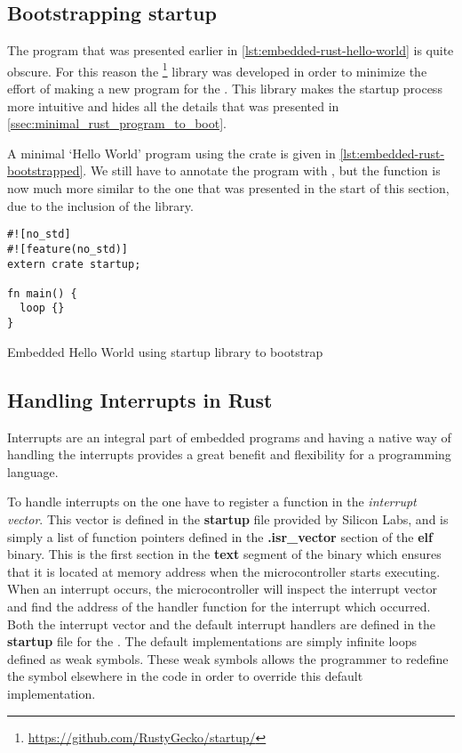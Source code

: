 \subsection{Bootstrapping startup}
\label{sec:startup}

The {\rust} program that was presented earlier in \autoref{lst:embedded-rust-hello-world} is quite obscure.
For this reason the  \footnote{\url{https://github.com/RustyGecko/startup/}} library was developed in order to minimize the effort of making a new {\rust} program for the {\gecko}.
This library makes the startup process more intuitive and hides all the details that was presented in \autoref{ssec:minimal_rust_program_to_boot}.

A minimal `Hello World' program using the  crate is given in \autoref{lst:embedded-rust-bootstrapped}.
We still have to annotate the program with \code{\#[no\_std]}, but the  function is now much more similar to the one that was presented in the start of this section, due to the inclusion of the  library.

\begin{listing}[H]
  \begin{verbatim}
#![no_std]
#![feature(no_std)]
extern crate startup;

fn main() {
  loop {}
}
  \end{verbatim}
  \caption{Embedded Hello World using startup library to bootstrap}
  \label{lst:embedded-rust-bootstrapped}
\end{listing}

\subsection{Handling Interrupts in Rust}
\label{sec:impl:handling-interrupts}

Interrupts are an integral part of embedded programs and having a native way of handling the interrupts provides a great benefit and flexibility for a programming language.

To handle interrupts on the {\gecko} one have to register a function in the \emph{interrupt vector}.
This vector is defined in the \textbf{startup} file provided by Silicon Labs, and is simply a list of function pointers defined in the \textbf{.isr\_vector} section of the \textbf{elf} binary.
This is the first section in the \textbf{text} segment of the binary which ensures that it is located at memory address  when the microcontroller starts executing.
When an interrupt occurs, the microcontroller will inspect the interrupt vector and find the address of the handler function for the interrupt which occurred.
Both the interrupt vector and the default interrupt handlers are defined in the \textbf{startup} file for the {\gecko}.
The default implementations are simply infinite loops defined as weak symbols.
These weak symbols allows the programmer to redefine the symbol elsewhere in the code in order to override this default implementation.

